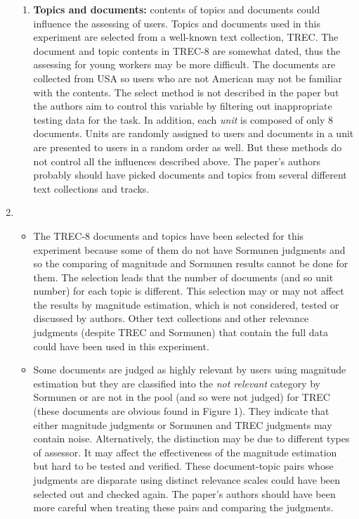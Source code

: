 \documentclass{article}
\begin{document}
\begin{enumerate}
\begin{enumerate}
	\item \textbf{Topics and documents:} contents of topics and documents could influence the assessing of users. Topics and documents used in this experiment are selected from a well-known text collection, TREC. The document and topic contents in TREC-8 are somewhat dated, thus the assessing for young workers may be more difficult. The documents are collected from USA so users who are not American may not be familiar with the contents. The select method is not described in the paper but the authors aim to control this variable by filtering out inappropriate testing data for the task. In addition, each \textit{unit} is composed of only 8 documents. Units are randomly assigned to users and documents in a unit are presented to users in a random order as well. But these methods do not control all the influences described above. The paper's authors probably should have picked documents and topics from several different text collections and tracks.
	
\end{enumerate}

\item \begin{itemize} 
		\item The TREC-8 documents and topics have been selected for this experiment because some of them do not have Sormunen judgments and so the comparing of magnitude and Sormunen results cannot be done for them. The selection leads that the number of documents (and so unit number) for each topic is different. This selection may or may not affect the results by magnitude estimation, which is not considered, tested or discussed by authors. Other text collections and other relevance judgments (despite TREC and Sormunen) that contain the full data could have been used in this experiment.
		\item Some documents are judged as highly relevant by users using magnitude estimation but they are classified into the \textit{not relevant} category by Sormunen or are not in the pool (and so were not judged) for TREC (these documents are obvious found in Figure 1). They indicate that either magnitude judgments or Sormunen and TREC judgments may contain noise. Alternatively, the distinction may be due to different types of assessor. It may affect the effectiveness of the magnitude estimation but hard to be tested and verified. These document-topic pairs whose judgments are disparate using distinct relevance scales could have been selected out and checked again. The paper's authors should have been more careful when treating these pairs and comparing the judgments.
		\end{itemize} 

\end{enumerate}
\end{document}
